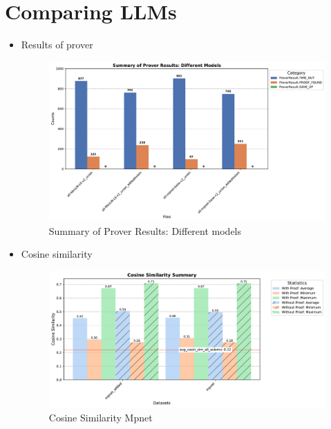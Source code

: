 \documentclass[english,version-2020-11]{uzl-thesis}
\begin{document}
    \section{Comparing LLMs}
      \begin{itemize}
        \item Results of prover
          \begin{figure}[h!]
            \centering
            \includegraphics[width=\textwidth]{different_mode_output.pdf} %
            \caption{Summary of Prover Results: Different models}
            \label{fig:results_different_models}
          \end{figure}
        \item Cosine similarity
          \begin{figure}[h!]
            \centering
            \includegraphics[width=\textwidth]{cosine_similarity_mpnet_summary.pdf} %
            \caption{Cosine Similarity Mpnet}
            \label{fig:cosine_similarity_mpnet}
          \end{figure}
          \clearpage
      \end{itemize}
\end{document}
